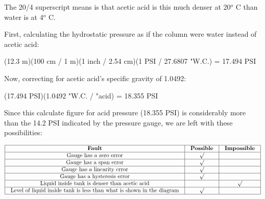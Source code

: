 





The 20/4 superscript means is that acetic acid is this much denser at 20$^{o}$ C than water is at 4$^{o}$ C.







First, calculating the hydrostatic pressure as if the column were water instead of acetic acid:

\vskip 10pt

(12.3 m)(100 cm / 1 m)(1 inch / 2.54 cm)(1 PSI / 27.6807 "W.C.) = 17.494 PSI

\vskip 10pt

Now, correcting for acetic acid's specific gravity of 1.0492:

\vskip 10pt

(17.494 PSI)(1.0492 "W.C. / "acid) = 18.355 PSI

\vskip 10pt

Since this calculate figure for acid pressure (18.355 PSI) is considerably more than the 14.2 PSI indicated by the pressure gauge, we are left with these possibilities:

\vskip 10pt


$$\vbox{\offinterlineskip
\halign{\strut
\vrule \quad\hfil # \ \hfil & 
\vrule \quad\hfil # \ \hfil & 
\vrule \quad\hfil # \ \hfil \vrule \cr
\noalign{\hrule}
%
{\bf Fault} & {\bf Possible} & {\bf Impossible} \cr
%
\noalign{\hrule}
%
Gauge has a zero error & $\surd$ &  \cr
%
\noalign{\hrule}
%
Gauge has a span error & $\surd$ &  \cr
%
\noalign{\hrule}
%
Gauge has a linearity error & $\surd$ &  \cr
%
\noalign{\hrule}
%
Gauge has a hysteresis error & $\surd$ &  \cr
%
\noalign{\hrule}
%
Liquid inside tank is denser than acetic acid &  & $\surd$ \cr
%
\noalign{\hrule}
%
Level of liquid inside tank is less than what is shown in the diagram & $\surd$ &  \cr
%
\noalign{\hrule}
} %
}$$ %





